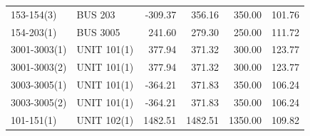 \documentclass[10pt]{report}
\begin{document}
\begin{table}[H]
{\begin{tabular}{llrrrr}
153-154(3) & BUS 203 & -309.37 & 356.16 & 350.00 & 101.76 \\
154-203(1) & BUS 3005 & 241.60 & 279.30 & 250.00 & 111.72 \\
3001-3003(1) & UNIT 101(1) & 377.94 & 371.32 & 300.00 & 123.77 \\
3001-3003(2) & UNIT 101(1) & 377.94 & 371.32 & 300.00 & 123.77 \\
3003-3005(1) & UNIT 101(1) & -364.21 & 371.83 & 350.00 & 106.24 \\
3003-3005(2) & UNIT 101(1) & -364.21 & 371.83 & 350.00 & 106.24 \\
101-151(1) & UNIT 102(1) & 1482.51 & 1482.51 & 1350.00 & 109.82 \\
\bottomrule
\end{tabular}}
\end{table}
\end{document}
